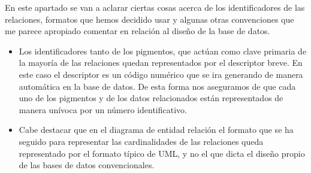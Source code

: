 En este apartado se van a aclarar ciertas cosas acerca de los identificadores de las relaciones, formatos que hemos decidido usar y algunas otras convenciones que me parece apropiado comentar en relación al diseño de la base de datos. 

\begin{itemize}
    \item Los identificadores tanto de los pigmentos, que actúan como clave primaria de la mayoría de las relaciones quedan representados por el descriptor breve. En este caso el descriptor es un código numérico que se ira generando de manera automática en la base de datos. De esta forma nos aseguramos de que cada uno de los pigmentos y de los datos relacionados están representados de manera unívoca por un número identificativo. 
    \item Cabe destacar que en el diagrama de entidad relación el formato que se ha seguido para representar las cardinalidades de las relaciones queda representado por el formato típico de UML, y no el que dicta el diseño propio de las bases de datos convencionales. 
\end{itemize}